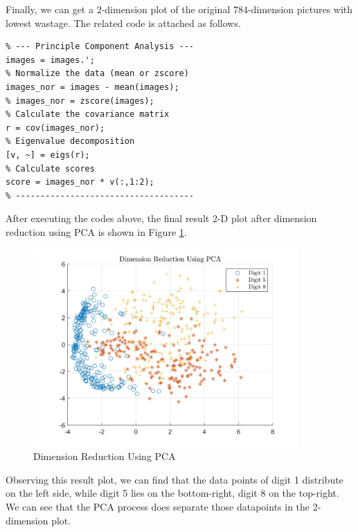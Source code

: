\documentclass[a4paper,12pt]{article} %
\begin{document}
\hspace{0.7cm}
Finally, we can get a $2$-dimension plot of the original $784$-dimension pictures with lowest wastage. The related code is attached as follows.

\begin{footnotesize}
\begin{verbatim}
% --- Principle Component Analysis ---
images = images.';
% Normalize the data (mean or zscore)
images_nor = images - mean(images);
% images_nor = zscore(images);
% Calculate the covariance matrix
r = cov(images_nor);
% Eigenvalue decomposition
[v, ~] = eigs(r);
% Calculate scores
score = images_nor * v(:,1:2);
% ------------------------------------
\end{verbatim}
\end{footnotesize}

\hspace{0.7cm}
After executing the codes above, the final result 2-D plot after dimension reduction using PCA is shown in Figure \ref{fig:1}.

\begin{figure}[!htbp]
	\centering
	\includegraphics[width=0.9\textwidth]{PCA.jpg}
	\caption{Dimension Reduction Using PCA}
	\label{fig:1}
\end{figure}

\hspace{0.7cm}
Observing this result plot, we can find that the data points of digit 1 distribute on the left side, while digit 5 lies on the bottom-right, digit 8 on the top-right. We can see that the PCA process does separate those datapoints in the 2-dimension plot.
\end{document}
